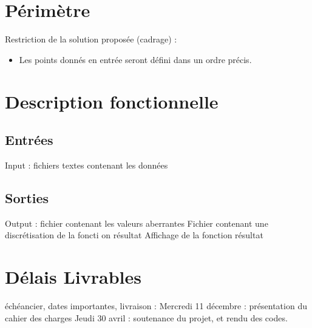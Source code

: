 \documentclass[a4paper,12pt]{article}
\begin{document}
\newpage
\section{Périmètre}

Restriction de la solution proposée (cadrage) :
\begin{itemize}
\item Les points donnés en entrée seront défini dans un ordre précis.
\end{itemize}

\newpage
\section{Description fonctionnelle}

\subsection{Entrées}

Input : fichiers textes contenant les données

\subsection{Sorties}

Output : fichier contenant les valeurs aberrantes
	   Fichier contenant une discrétisation de la foncti on résultat
	   Affichage de la fonction résultat

\newpage
\section{Délais Livrables}

échéancier, dates importantes, livraison :
Mercredi 11 décembre : présentation du cahier des charges
Jeudi 30 avril : soutenance du projet, et rendu des codes.
\end{document}
